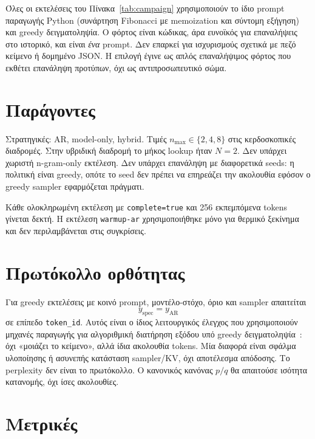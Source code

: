 \documentclass[a4paper,12pt]{report}
\theoremstyle{plain}
\theoremstyle{definition}
\theoremstyle{remark}
\begin{document}
Όλες οι εκτελέσεις του Πίνακα~\ref{tab:campaign} χρησιμοποιούν το ίδιο
prompt παραγωγής Python (συνάρτηση Fibonacci με memoization και σύντομη
εξήγηση) και greedy δειγματοληψία. Ο φόρτος είναι κώδικας, άρα ευνοϊκός για
επαναλήψεις στο ιστορικό, και είναι \emph{ένα} prompt. Δεν επαρκεί για
ισχυρισμούς σχετικά με πεζό κείμενο ή δομημένο JSON. Η επιλογή έγινε ως απλός
επαναλήψιμος φόρτος που εκθέτει επανάληψη προτύπων, όχι ως αντιπροσωπευτικό
σώμα.

\section{Παράγοντες}

Στρατηγικές: AR, model-only, hybrid. Τιμές \(n_{\max}\in\{2,4,8\}\) στις
κερδοσκοπικές διαδρομές. Στην υβριδική διαδρομή το μήκος lookup ήταν
\(N=2\). Δεν υπάρχει χωριστή n-gram-only εκτέλεση. Δεν υπάρχει επανάληψη με
διαφορετικά seeds: η πολιτική είναι greedy, οπότε το seed δεν πρέπει να
επηρεάζει την ακολουθία εφόσον ο greedy sampler εφαρμόζεται πράγματι.

Κάθε ολοκληρωμένη εκτέλεση με \texttt{complete=true} και 256 εκπεμπόμενα
tokens γίνεται δεκτή. Η εκτέλεση \texttt{warmup-ar} χρησιμοποιήθηκε μόνο για
θερμικό ξεκίνημα και δεν περιλαμβάνεται στις συγκρίσεις.

\section{Πρωτόκολλο ορθότητας}

Για greedy εκτελέσεις με κοινό prompt, μοντέλο-στόχο, όριο και sampler
απαιτείται
\[
  y_{\mathrm{spec}}=y_{\mathrm{AR}}
\]
σε επίπεδο \texttt{token\_id}. Αυτός είναι ο ίδιος λειτουργικός έλεγχος που
χρησιμοποιούν μηχανές παραγωγής για αλγοριθμική διατήρηση εξόδου υπό greedy
δειγματοληψία~\cite{vllm-speculative-docs}: όχι «μοιάζει το κείμενο», αλλά ίδια
ακολουθία tokens. Μία διαφορά είναι σφάλμα υλοποίησης ή ασυνεπής κατάσταση
sampler/KV, όχι αποτέλεσμα απόδοσης. Το perplexity δεν είναι το πρωτόκολλο.
Ο κανονικός κανόνας \(p/q\) θα απαιτούσε ισότητα κατανομής, όχι ίσες
ακολουθίες.

\section{Μετρικές}
\label{sec:metrics}
\end{document}
